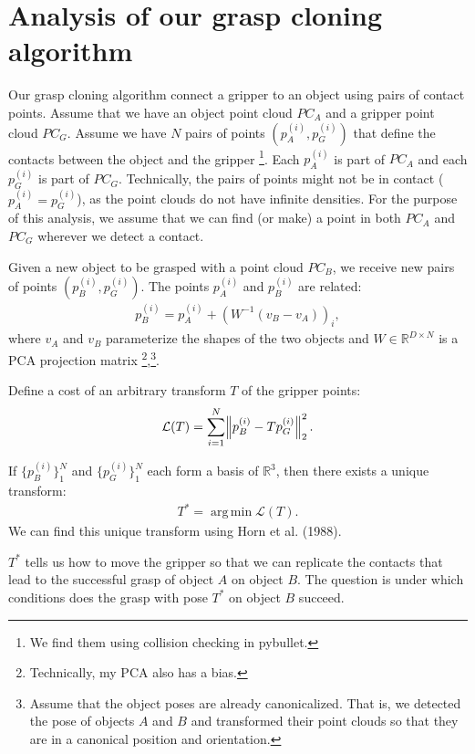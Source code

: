 \documentclass{article}
\DeclareMathOperator*{\argmin}{arg\,min}
\begin{document}
\section{Analysis of our grasp cloning algorithm}

Our grasp cloning algorithm connect a gripper to an object using pairs of contact points. Assume that we have an object point cloud $PC_A$ and a gripper point cloud $PC_G$. Assume we have $N$ pairs of points $(p^{(i)}_A, p^{(i)}_G)$ that define the contacts between the object and the gripper \footnote{We find them using collision checking in pybullet.}. Each $p^{(i)}_A$ is part of $PC_A$ and each $p^{(i)}_G$ is part of $PC_G$. Technically, the pairs of points might not be in contact ($p^{(i)}_A = p^{(i)}_G$), as the point clouds do not have infinite densities. For the purpose of this analysis, we assume that we can find (or make) a point in both $PC_A$ and $PC_G$ wherever we detect a contact.

Given a new object to be grasped with a point cloud $PC_B$, we receive new pairs of points $(p^{(i)}_B, p^{(i)}_G)$. The points $p^{(i)}_A$ and $p^{(i)}_B$ are related:
\begin{align}
    p^{(i)}_B = p^{(i)}_A + (W^{-1}(v_B - v_A))_i,
\end{align}
where $v_A$ and $v_B$ parameterize the shapes of the two objects and $W \in \mathbb{R}^{D{\times}N}$ is a PCA projection matrix \footnote{Technically, my PCA also has a bias.},\footnote{Assume that the object poses are already canonicalized. That is, we detected the pose of objects $A$ and $B$ and transformed their point clouds so that they are in a canonical position and orientation.}.

Define a cost of an arbitrary transform $T$ of the gripper points:
\begin{align}
    \mathcal{L}(T) = \sum_{i=1}^N \norm{ p^{(i)}_B - T p^{(i)}_G }_2^2.
\end{align}

If $\{ p^{(i)}_B \}_1^N$ and $\{ p^{(i)}_G \}_1^N$ each form a basis of $\mathbb{R}^3$, then there exists a unique transform:
\begin{align}
    T^* = \argmin \mathcal{L}(T).
\end{align}
We can find this unique transform using Horn et al. (1988).

$T^*$ tells us how to move the gripper so that we can replicate the contacts that lead to the successful grasp of object $A$ on object $B$. The question is under which conditions does the grasp with pose $T^*$ on object $B$ succeed.
\end{document}
